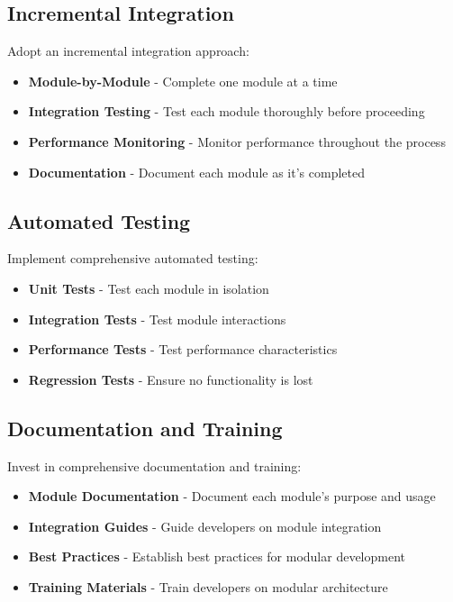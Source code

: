 \documentclass[11pt]{article}
\begin{document}
\subsection{Incremental Integration}

Adopt an incremental integration approach:

\begin{itemize}
\item \textbf{Module-by-Module} - Complete one module at a time
\item \textbf{Integration Testing} - Test each module thoroughly before proceeding
\item \textbf{Performance Monitoring} - Monitor performance throughout the process
\item \textbf{Documentation} - Document each module as it's completed
\end{itemize}

\subsection{Automated Testing}

Implement comprehensive automated testing:

\begin{itemize}
\item \textbf{Unit Tests} - Test each module in isolation
\item \textbf{Integration Tests} - Test module interactions
\item \textbf{Performance Tests} - Test performance characteristics
\item \textbf{Regression Tests} - Ensure no functionality is lost
\end{itemize}

\subsection{Documentation and Training}

Invest in comprehensive documentation and training:

\begin{itemize}
\item \textbf{Module Documentation} - Document each module's purpose and usage
\item \textbf{Integration Guides} - Guide developers on module integration
\item \textbf{Best Practices} - Establish best practices for modular development
\item \textbf{Training Materials} - Train developers on modular architecture
\end{itemize}
\end{document}
